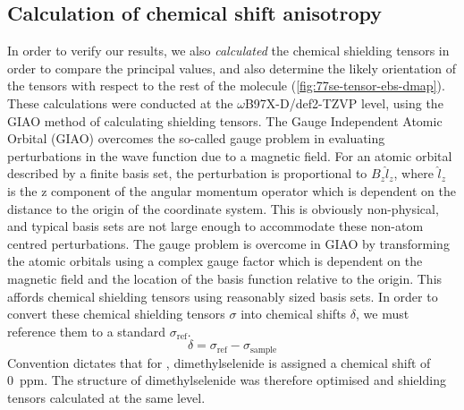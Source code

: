 \begin{refsection}
\subsection{Calculation of chemical shift anisotropy}
In order to verify our results, we also \emph{calculated} the chemical shielding tensors in order to compare the principal values, and also determine the likely orientation of the tensors with respect to the rest of the molecule (\cref{fig:77se-tensor-ebs-dmap}).
These calculations were conducted at the $ \omega $B97X-D/def2-TZVP level, using the GIAO method of calculating shielding tensors.\autocite{Schreckenbach1995CalculationTheory,Schreckenbach1996TheApproximation}
The Gauge Independent Atomic Orbital (GIAO) overcomes the so-called gauge problem in evaluating perturbations in the wave function due to a magnetic field.
For an atomic orbital described by a finite basis set, the perturbation is proportional to $B_{z}\hat{l}_{z}$, where $\hat{l}_{z}$ is the z component of the angular momentum operator which is dependent on the distance to the origin of the coordinate system.
This is obviously non-physical, and typical basis sets are not large enough to accommodate these non-atom centred perturbations.
The gauge problem is overcome in GIAO by transforming the atomic orbitals using a complex gauge factor which is dependent on the magnetic field and the location of the basis function relative to the origin.
This affords chemical shielding tensors using reasonably sized basis sets.
In order to convert these chemical shielding tensors $ \sigma $ into chemical shifts $ \delta $, we must reference them to a standard $\sigma_{\textrm{ref}}$.
\begin{equation}
  \delta = \sigma_{\textrm{ref}} - \sigma_{\textrm{sample}}
  \label{eqn:shieldingtoshift}
\end{equation}
Convention dictates that for , dimethylselenide is assigned a chemical shift of 0~ppm.
The structure of dimethylselenide was therefore optimised and shielding tensors calculated at the same level.


\end{refsection}
